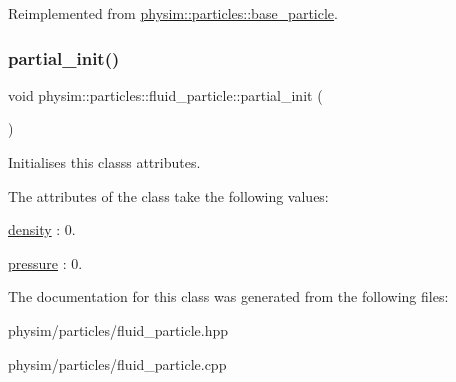Reimplemented from \hyperlink{classphysim_1_1particles_1_1base__particle_a3bba517d51fd0bff7ec583e701765f87}{physim\+::particles\+::base\+\_\+particle}.

\mbox{\label{classphysim_1_1particles_1_1fluid__particle_a5860aec6ef23bd4a700df26eb6b7b2f7}} 
\subsubsection{\texorpdfstring{partial\+\_\+init()}{partial\_init()}}
{\footnotesize\ttfamily void physim\+::particles\+::fluid\+\_\+particle\+::partial\+\_\+init (\begin{DoxyParamCaption}{ }\end{DoxyParamCaption})\hspace{0.3cm}{\ttfamily [private]}}



Initialises this class\textquotesingle{}s attributes. 

The attributes of the class take the following values\+:
\begin{DoxyItemize}
\item \hyperlink{classphysim_1_1particles_1_1fluid__particle_a0664c7d411aae32890f6fd359c74f2bc}{density} \+: 0.
\item \hyperlink{classphysim_1_1particles_1_1fluid__particle_a2829dc6a83026e0854dd0ef4064f19b6}{pressure} \+: 0. 
\end{DoxyItemize}

The documentation for this class was generated from the following files\+:\begin{DoxyCompactItemize}
\item 
physim/particles/fluid\+\_\+particle.\+hpp\item 
physim/particles/fluid\+\_\+particle.\+cpp\end{DoxyCompactItemize}
